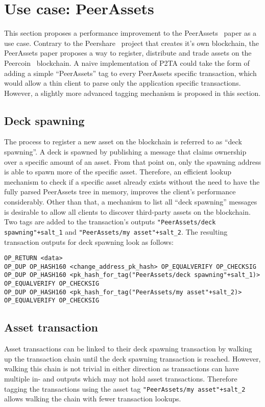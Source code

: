 \documentclass[a4paper,10pt]{article}
\begin{document}
\section{Use case: PeerAssets}
This section proposes a performance improvement to the PeerAssets~\cite{Pchem} paper as a use case.
Contrary to the Peershare~\cite{Lee13} project that creates it's own blockchain, the PeerAssets paper proposes a way to register, distribute and trade assets on the Peercoin~\cite{King12} blockchain.
A naive implementation of P2TA could take the form of adding a simple ``PeerAssets'' tag to every PeerAssets specific transaction, which would allow a thin client to parse only the application specific transactions.
However, a slightly more advanced tagging mechanism is proposed in this section.

\subsection{Deck spawning}
The process to register a new asset on the blockchain is referred to as ``deck spawning''. A deck is spawned by publishing a message that claims ownership over a specific amount of an asset. From that point on, only the spawning address is able to spawn more of the specific asset. Therefore, an efficient lookup mechanism to check if a specific asset already exists without the need to have the fully parsed PeerAssets tree in memory, improves the client's performance considerably. Other than that, a mechanism to list all ``deck spawning'' messages is desirable to allow all clients to discover third-party assets on the blockchain.
Two tags are added to the transaction's outputs \verb|"PeerAssets/deck spawning"+salt_1| and \verb|"PeerAssets/my asset"+salt_2|.
The resulting transaction outputs for deck spawning look as follows:
\begin{scriptsize}\begin{verbatim}
OP_RETURN <data>
OP_DUP OP_HASH160 <change_address_pk_hash> OP_EQUALVERIFY OP_CHECKSIG
OP_DUP OP_HASH160 <pk_hash_for_tag("PeerAssets/deck spawning"+salt_1)> OP_EQUALVERIFY OP_CHECKSIG
OP_DUP OP_HASH160 <pk_hash_for_tag("PeerAssets/my asset"+salt_2)> OP_EQUALVERIFY OP_CHECKSIG
\end{verbatim}\end{scriptsize}

\subsection{Asset transaction}
Asset transactions can be linked to their deck spawning transaction by walking up the transaction chain until the deck spawning transaction is reached.
However, walking this chain is not trivial in either direction as transactions can have multiple in- and outputs which may not hold asset transactions.
Therefore tagging the transactions using the asset tag \verb|"PeerAssets/my asset"+salt_2| allows walking the chain with fewer transaction lookups.
\end{document}
